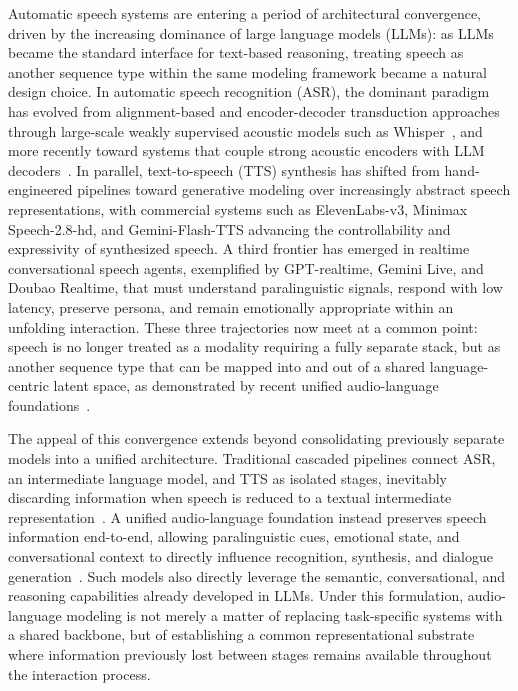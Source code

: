 \documentclass{llmxive}
\begin{document}
Automatic speech systems are entering a period of architectural convergence, driven by the increasing dominance of large language models (LLMs): as LLMs became the standard interface for text-based reasoning, treating speech as another sequence type within the same modeling framework became a natural design choice. In automatic speech recognition (ASR), the dominant paradigm has evolved from alignment-based and encoder-decoder transduction approaches~\citep{graves2012connectionist,graves2012sequence,chan2015listen} through large-scale weakly supervised acoustic models such as Whisper~\citep{radford2023robust}, and more recently toward systems that couple strong acoustic encoders with LLM decoders~\citep{peng2026vibevoiceasrtechnicalreport, an2025funasrtechnicalreport, bai2024seed, shi2026qwen3asrtechnicalreport}. In parallel, text-to-speech (TTS) synthesis has shifted from hand-engineered pipelines toward generative modeling over increasingly abstract speech representations, with commercial systems such as ElevenLabs-v3, Minimax Speech-2.8-hd, and Gemini-Flash-TTS advancing the controllability and expressivity of synthesized speech. A third frontier has emerged in realtime conversational speech agents, exemplified by GPT-realtime, Gemini Live, and Doubao Realtime, that must understand paralinguistic signals, respond with low latency, preserve persona, and remain emotionally appropriate within an unfolding interaction. These three trajectories now meet at a common point: speech is no longer treated as a modality requiring a fully separate stack, but as another sequence type that can be mapped into and out of a shared language-centric latent space, as demonstrated by recent unified audio-language foundations~\citep{wu2025stepaudio2technicalreport, xu2025qwen3omnitechnicalreport,liu2026omni}.

The appeal of this convergence extends beyond consolidating previously separate models into a unified architecture. Traditional cascaded pipelines connect ASR, an intermediate language model, and TTS as isolated stages, inevitably discarding information when speech is reduced to a textual intermediate representation~\citep{tang2024salmonn, borsos2023audiolm, cui2025recent}. A unified audio-language foundation instead preserves speech information end-to-end, allowing paralinguistic cues, emotional state, and conversational context to directly influence recognition, synthesis, and dialogue generation~\citep{kim2024paralinguistics, wang2025freezeomni,li2026depflow,xuan2023new,deng2025multi}. Such models also directly leverage the semantic, conversational, and reasoning capabilities already developed in LLMs. Under this formulation, audio-language modeling is not merely a matter of replacing task-specific systems with a shared backbone, but of establishing a common representational substrate where information previously lost between stages remains available throughout the interaction process.
\end{document}

